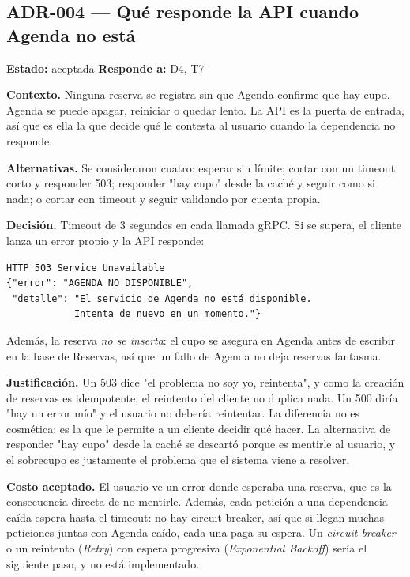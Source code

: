 \documentclass[12pt, a4paper]{article}
\begin{document}
\subsection{ADR-004 \texorpdfstring{---}{---} Qué responde la API cuando Agenda no está}

\textbf{Estado:} aceptada \hfill \textbf{Responde a:} D4, T7

\textbf{Contexto.} Ninguna reserva se registra sin que Agenda confirme que
hay cupo. Agenda se puede apagar, reiniciar o quedar lento. La API es la
puerta de entrada, así que es ella la que decide qué le contesta al
usuario cuando la dependencia no responde.

\textbf{Alternativas.} Se consideraron cuatro: esperar sin límite;
cortar con un timeout corto y responder 503; responder "hay cupo" desde la
caché y seguir como si nada; o cortar con timeout y seguir validando por
cuenta propia.

\textbf{Decisión.} Timeout de 3 segundos en cada llamada gRPC. Si se supera,
el cliente lanza un error propio y la API responde:

\begin{lstlisting}[caption={Respuesta cuando Agenda no responde.}]
HTTP 503 Service Unavailable
{"error": "AGENDA_NO_DISPONIBLE",
 "detalle": "El servicio de Agenda no está disponible.
            Intenta de nuevo en un momento."}
\end{lstlisting}

Además, la reserva \emph{no se inserta}: el cupo se asegura en Agenda antes
de escribir en la base de Reservas, así que un fallo de Agenda no deja
reservas fantasma.

\textbf{Justificación.} Un 503 dice "el problema no soy yo, reintenta", y
como la creación de reservas es idempotente, el reintento del cliente no
duplica nada. Un 500 diría "hay un error mío" y el usuario no debería
reintentar. La diferencia no es cosmética: es la que le permite a un
cliente decidir qué hacer. La alternativa de responder "hay cupo" desde la
caché se descartó porque es mentirle al usuario, y el sobrecupo es
justamente el problema que el sistema viene a resolver.

\textbf{Costo aceptado.} El usuario ve un error donde esperaba una reserva,
que es la consecuencia directa de no mentirle. Además, cada petición a
una dependencia caída espera hasta el timeout: no hay circuit breaker, así
que si llegan muchas peticiones juntas con Agenda caído, cada una paga su
espera. Un \textit{circuit breaker} o un reintento (\textit{Retry}) con 
espera progresiva (\textit{Exponential Backoff}) sería el siguiente paso, 
y no está implementado.
\end{document}
